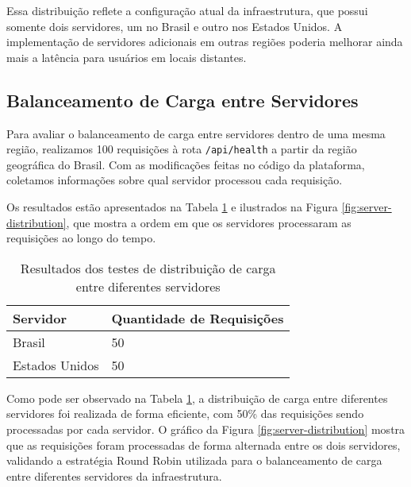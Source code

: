 Essa distribuição reflete a configuração atual da infraestrutura, que possui somente dois servidores, um no Brasil e outro nos Estados Unidos. A implementação de servidores adicionais em outras regiões poderia melhorar ainda mais a latência para usuários em locais distantes.

\subsection{Balanceamento de Carga entre Servidores}

Para avaliar o balanceamento de carga entre servidores dentro de uma mesma região, realizamos 100 requisições à rota \texttt{/api/health} a partir da região geográfica do Brasil. Com as modificações feitas no código da plataforma, coletamos informações sobre qual servidor processou cada requisição.

Os resultados estão apresentados na Tabela \ref{tab:server-distribution} e ilustrados na Figura \ref{fig:server-distribution}, que mostra a ordem em que os servidores processaram as requisições ao longo do tempo.

\begin{table}[H]
    \centering
    \caption{Resultados dos testes de distribuição de carga entre diferentes servidores}
    \label{tab:server-distribution}
    \begin{tabular}{|l|l|}
        \hline
        \textbf{Servidor} & \textbf{Quantidade de Requisições} \\ \hline
        Brasil            & 50                                 \\ \hline
        Estados Unidos    & 50                                 \\ \hline
    \end{tabular}
\end{table}


Como pode ser observado na Tabela \ref{tab:server-distribution}, a distribuição de carga entre diferentes servidores foi realizada de forma eficiente, com 50\% das requisições sendo processadas por cada servidor. O gráfico da Figura \ref{fig:server-distribution} mostra que as requisições foram processadas de forma alternada entre os dois servidores, validando a estratégia Round Robin utilizada para o balanceamento de carga entre diferentes servidores da infraestrutura.

